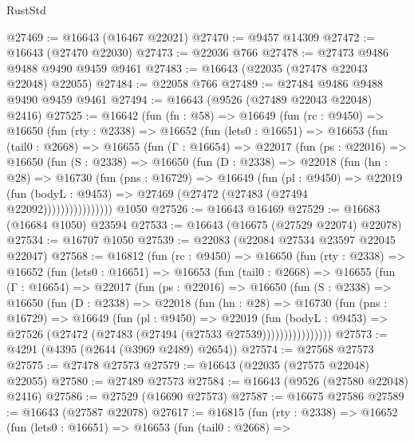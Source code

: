 \begin{lexlean}{RustStd}
\begin{coremodule}
@27469 := @16643 (@16467 @22021)
@27470 := @9457 @14309
@27472 := @16643 (@27470 @22030)
@27473 := @22036 @766
@27478 := @27473 @9486 @9488 @9490 @9459 @9461
@27483 := @16643 (@22035 (@27478 @22043 @22048) @22055)
@27484 := @22058 @766
@27489 := @27484 @9486 @9488 @9490 @9459 @9461
@27494 := @16643 (@9526 (@27489 @22043 @22048) @2416)
@27525 := @16642
    (fun (fn : @58) =>
    @16649
      (fun (rc : @9450) =>
      @16650
        (fun (rty : @2338) =>
        @16652
          (fun (lets0 : @16651) =>
          @16653
            (fun (tail0 : @2668) =>
            @16655
              (fun (Γ : @16654) =>
              @22017
                (fun (ps : @22016) =>
                @16650
                  (fun (S : @2338) =>
                  @16650
                    (fun (D : @2338) =>
                    @22018
                      (fun (hn : @28) =>
                      @16730
                        (fun (pns : @16729) =>
                        @16649
                          (fun (pl : @9450) =>
                          @22019
                            (fun (bodyL : @9453) =>
                            @27469 (@27472 (@27483 (@27494 @22092))))))))))))))))
    @1050
@27526 := @16643 @16469
@27529 := @16683 (@16684 @1050) @23594
@27533 := @16643 (@16675 (@27529 @22074) @22078)
@27534 := @16707 @1050
@27539 := @22083 (@22084 @27534 @23597 @22045 @22047)
@27568 := @16812
    (fun (rc : @9450) =>
    @16650
      (fun (rty : @2338) =>
      @16652
        (fun (lets0 : @16651) =>
        @16653
          (fun (tail0 : @2668) =>
          @16655
            (fun (Γ : @16654) =>
            @22017
              (fun (ps : @22016) =>
              @16650
                (fun (S : @2338) =>
                @16650
                  (fun (D : @2338) =>
                  @22018
                    (fun (hn : @28) =>
                    @16730
                      (fun (pns : @16729) =>
                      @16649
                        (fun (pl : @9450) =>
                        @22019
                          (fun (bodyL : @9453) =>
                          @27526 (@27472 (@27483 (@27494 (@27533 @27539))))))))))))))))
@27573 := @4291 (@4395 (@2644 (@3969 @2489) @2654))
@27574 := @27568 @27573
@27575 := @27478 @27573
@27579 := @16643 (@22035 (@27575 @22048) @22055)
@27580 := @27489 @27573
@27584 := @16643 (@9526 (@27580 @22048) @2416)
@27586 := @27529 (@16690 @27573)
@27587 := @16675 @27586
@27589 := @16643 (@27587 @22078)
@27617 := @16815
    (fun (rty : @2338) =>
    @16652
      (fun (lets0 : @16651) =>
      @16653
        (fun (tail0 : @2668) =>

\end{coremodule}
\end{lexlean}
